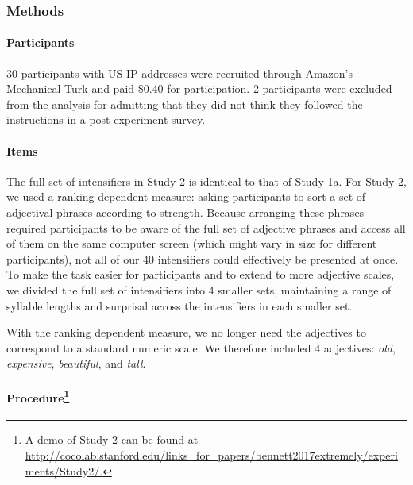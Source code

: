 \documentclass[10pt,letterpaper]{article}
\newcommand{\w}[1]{\emph{#1}}
\begin{document}
\subsubsection{Methods}

\paragraph{Participants}

30 participants with US IP addresses were recruited through Amazon's Mechanical Turk and paid \$0.40 for  participation. 2 participants were excluded from the analysis for admitting that they did not think they followed the instructions in a post-experiment survey.

\paragraph{Items}

The full set of intensifiers in Study \hyperref[sec:study2]{2} is identical to that of Study \hyperref[sec:study1a]{1a}. 
For Study \hyperref[sec:study2]{2}, we used a ranking dependent measure: asking participants to sort a set of adjectival phrases according to strength.
Because arranging these phrases required participants to be aware of the full set of adjective phrases and access all of them on the same computer screen (which might vary in size for different participants), not all of our 40 intensifiers could effectively be presented at once.
To make the task easier for participants and to extend to more adjective scales, we divided the full set of intensifiers into 4 smaller sets, maintaining a range of syllable lengths and surprisal across the intensifiers in each smaller set.

With the ranking dependent measure, we no longer need the adjectives to correspond to a standard numeric scale.
We therefore included 4 adjectives: \w{old}, \w{expensive}, \w{beautiful}, and \w{tall}.

\paragraph{Procedure\footnote{A demo of Study \hyperref[sec:study2]{2} can be found at \url{http://cocolab.stanford.edu/links_for_papers/bennett2017extremely/experiments/Study2/.}}}
\end{document}
